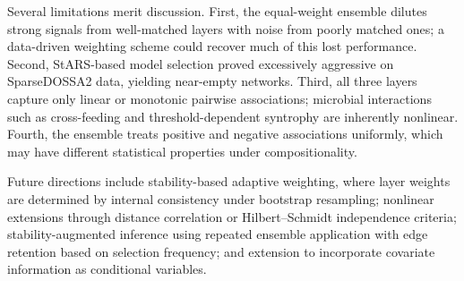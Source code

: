 \documentclass[fleqn]{nature}
\begin{document}
Several limitations merit discussion.
First, the equal-weight ensemble dilutes strong signals from well-matched layers with noise from poorly matched ones; a data-driven weighting scheme could recover much of this lost performance.
Second, StARS-based model selection proved excessively aggressive on SparseDOSSA2 data, yielding near-empty networks.
Third, all three layers capture only linear or monotonic pairwise associations; microbial interactions such as cross-feeding and threshold-dependent syntrophy are inherently nonlinear.
Fourth, the ensemble treats positive and negative associations uniformly, which may have different statistical properties under compositionality.

Future directions include stability-based adaptive weighting, where layer weights are determined by internal consistency under bootstrap resampling; nonlinear extensions through distance correlation or Hilbert--Schmidt independence criteria; stability-augmented inference using repeated ensemble application with edge retention based on selection frequency; and extension to incorporate covariate information as conditional variables.


\end{document}
